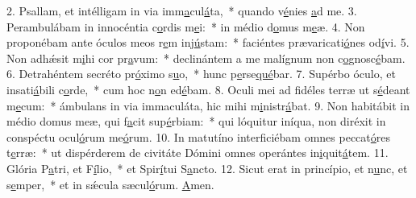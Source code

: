 2. Psallam, et intélligam in via imm\uline{a}cul\uline{á}ta,~* quando v\uline{é}nies \uline{a}d me.
3. Perambulábam in innocéntia c\uline{o}rdis m\uline{e}i:~* in médio d\uline{o}mus m\uline{e}æ.
4. Non proponébam ante óculos meos r\uline{e}m inj\uline{ú}stam:~* faciéntes prævaricati\uline{ó}nes od\uline{í}vi.
5. Non adhǽsit m\uline{i}hi cor pr\uline{a}vum:~* declinántem a me malígnum non c\uline{o}gnosc\uline{é}bam.
6. Detrahéntem secréto pr\uline{ó}ximo s\uline{u}o,~* hunc p\uline{e}rse\uline{qué}bar.
7. Supérbo óculo, et insati\uline{á}bili c\uline{o}rde,~* cum hoc n\uline{o}n ed\uline{é}bam.
8. Oculi mei ad fidéles terræ ut s\uline{é}deant m\uline{e}cum:~* ámbulans in via immaculáta, hic mihi m\uline{i}nistr\uline{á}bat.
9. Non habitábit in médio domus meæ, qui f\uline{a}cit sup\uline{é}rbiam:~* qui lóquitur iníqua, non diréxit in conspéctu ocul\uline{ó}rum me\uline{ó}rum.
10. In matutíno interficiébam omnes peccat\uline{ó}res t\uline{e}rræ:~* ut dispérderem de civitáte Dómini omnes operántes in\uline{i}quit\uline{á}tem.
11. Glória P\uline{a}tri, et F\uline{í}lio,~* et Spir\uline{í}tui S\uline{a}ncto.
12. Sicut erat in princípio, et n\uline{u}nc, et s\uline{e}mper,~* et in sǽcula sæcul\uline{ó}rum. \uline{A}men.
